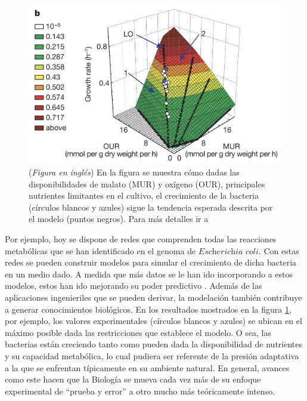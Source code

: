 \begin{figure}[tb]
  \centering
  \includegraphics[width=0.9\columnwidth]{images/Ecoli_growth.png}
  \caption{
      (\textit{Figura en inglés})
      En la figura se muestra cómo dadas las disponibilidades de malato (MUR) y oxígeno (OUR), principales nutrientes limitantes en el cultivo, el crecimiento de la bacteria (círculos blancos y azules) sigue la tendencia esperada descrita por el modelo (puntos negros).
      Para más detalles ir a \cite{ibarraEscherichiaColiK122002}
  }
  \label{fig:Ecoli_growth}
\end{figure}

Por ejemplo, hoy se dispone de redes que comprenden todas las reacciones metabólicas que se han identificado en el genoma de $\textit{Escherichia coli}$.
Con estas redes se pueden construir modelos para simular el crecimiento de dicha bacteria en un medio dado.
A medida que más datos se le han ido incorporando a estos modelos, estos han ido mejorando su poder predictivo \cite{ibarraEscherichiaColiK122002}.
Además de las aplicaciones ingenieriles que se pueden derivar, la modelación también contribuye a generar conocimientos biológicos.
En los resultados mostrados en la figura \ref{fig:Ecoli_growth}, por ejemplo, los valores experimentales (círculos blancos y azules) se ubican en el máximo posible dada las restricciones que establece el modelo.
O sea, las bacterias están creciendo tanto como pueden dada la disponibilidad de nutrientes y su capacidad metabólica, lo cual pudiera ser referente de la presión adaptativa a la que se enfrentan típicamente en su ambiente natural.
En general, avances como este hacen que la Biología se mueva cada vez más de su enfoque experimental de ``prueba y error'' a otro mucho más teóricamente intenso.

